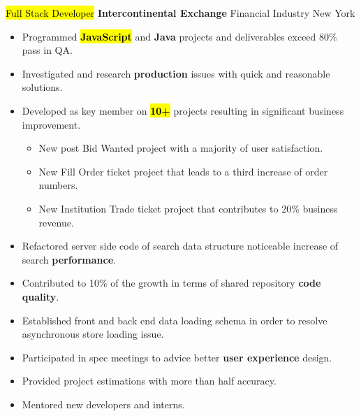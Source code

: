 \documentclass[11pt,a4paper,sans]{moderncv}   %
\begin{document}
{\hl{Full Stack Developer}}
{\textbf{Intercontinental Exchange}}
{Financial Industry}
{New York}
{
	\begin{itemize}
	  \item{Programmed \hl{\textbf{JavaScript}} and \textbf{Java} projects and deliverables exceed 80\% pass in QA.}
	  \item{Investigated and research \textbf{production} issues with quick and reasonable solutions.}
    \item{Developed as key member on \hl{\textbf{10+}} projects resulting in significant business improvement.}
    \begin{itemize}
      \item{New post Bid Wanted project with a majority of user satisfaction.}
      \item{New Fill Order ticket project that leads to a third increase of order numbers.}
      \item{New Institution Trade ticket project that contributes to 20\% business revenue.}
    \end{itemize}
    \item{Refactored server side code of search data structure noticeable increase of search \textbf{performance}.}
    \item{Contributed to 10\% of the growth in terms of shared repository \textbf{code quality}.}
    \item{Established front and back end data loading schema in order to resolve asynchronous store loading issue.}
    \item{Participated in spec meetings to advice better \textbf{user experience} design.}
    \item{Provided project estimations with more than half accuracy.}
    \item{Mentored new developers and interns.}
	\end{itemize}
}
\end{document}
